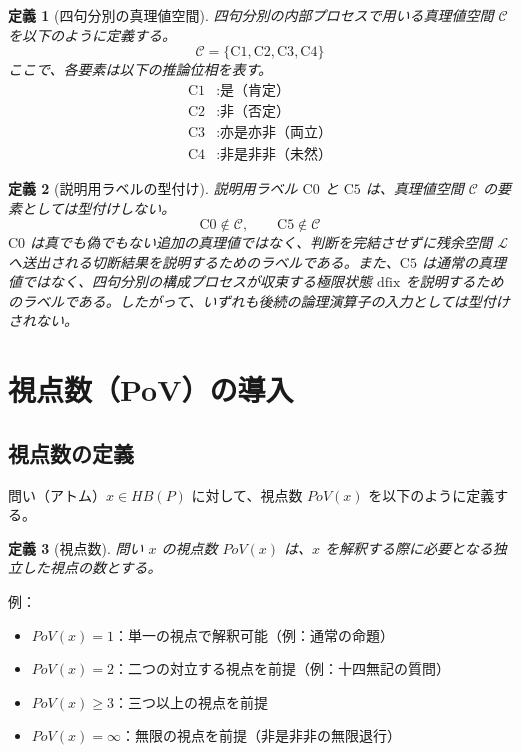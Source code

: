 \documentclass[11pt,a4paper]{article}
\newtheorem{definition}{定義}
\newcommand{\HB}{\mathit{HB}}
\newcommand{\PoV}{\mathit{PoV}}
\newcommand{\C}{\mathcal{C}}
\newcommand{\Lspace}{\mathcal{L}}
\newcommand{\Czero}{\text{C0}}
\newcommand{\dfix}{\text{dfix}}
\newcommand{\Cone}{\text{C1}}
\newcommand{\Ctwo}{\text{C2}}
\newcommand{\Cthree}{\text{C3}}
\newcommand{\Cfour}{\text{C4}}
\newcommand{\Cfive}{\text{C5}}
\begin{document}
\begin{definition}[四句分別の真理値空間]
四句分別の内部プロセスで用いる真理値空間 $\C$ を以下のように定義する。
\[
\C = \{\Cone, \Ctwo, \Cthree, \Cfour\}
\]
ここで、各要素は以下の推論位相を表す。
\begin{align*}
\Cone &: \text{是（肯定）} \\
\Ctwo &: \text{非（否定）} \\
\Cthree &: \text{亦是亦非（両立）} \\
\Cfour &: \text{非是非非（未然）}
\end{align*}
\end{definition}

\begin{definition}[説明用ラベルの型付け]
説明用ラベル $\Czero$ と $\Cfive$ は、真理値空間 $\C$ の要素としては型付けしない。
\[
\Czero \notin \C, \qquad \Cfive \notin \C
\]
$\Czero$ は真でも偽でもない追加の真理値ではなく、判断を完結させずに残余空間 $\Lspace$ へ送出される切断結果を説明するためのラベルである。また、$\Cfive$ は通常の真理値ではなく、四句分別の構成プロセスが収束する極限状態 $\dfix$ を説明するためのラベルである。したがって、いずれも後続の論理演算子の入力としては型付けされない。
\end{definition}

\section{視点数（PoV）の導入}
\label{sec:pov}

\subsection{視点数の定義}
\label{subsec:pov-def}

問い（アトム）$x \in \HB(P)$ に対して、視点数 $\PoV(x)$ を以下のように定義する。

\begin{definition}[視点数]
問い $x$ の視点数 $\PoV(x)$ は、$x$ を解釈する際に必要となる独立した視点の数とする。
\end{definition}

例：
\begin{itemize}
\item $\PoV(x) = 1$：単一の視点で解釈可能（例：通常の命題）
\item $\PoV(x) = 2$：二つの対立する視点を前提（例：十四無記の質問）
\item $\PoV(x) \geq 3$：三つ以上の視点を前提
\item $\PoV(x) = \infty$：無限の視点を前提（非是非非の無限退行）
\end{itemize}
\end{document}
